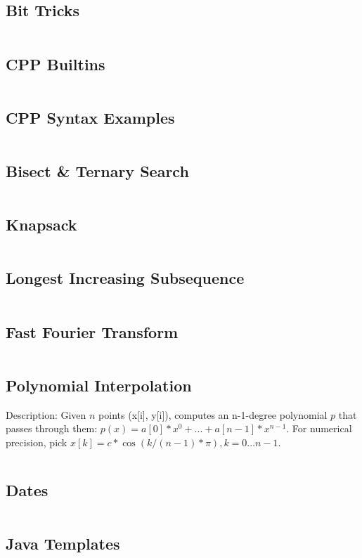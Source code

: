 \documentclass[letterpaper,landscape]{article}
\begin{document}
\begin{multicols*}{2}
  \subsection{Bit Tricks}
  \inputminted{cpp}{src/Misc/BitTricks.cpp}
  
  \subsection{CPP Builtins}
  \inputminted{text}{src/Misc/CPPBuiltins.cpp}
  
  \subsection{CPP Syntax Examples}
  \inputminted{cpp}{src/Misc/CPPSyntaxExamples.cpp}
  
  \subsection{Bisect \& Ternary Search}
  \inputminted{java}{src/Misc/Bisect.java}
  
  \subsection{Knapsack}
  \inputminted{java}{src/Misc/Knapsack.java}
  
  \subsection{Longest Increasing Subsequence}
  \inputminted{java}{src/Misc/LIS.java}
  
  \subsection{Fast Fourier Transform}
  \inputminted{cpp}{src/Misc/FFT.cpp}
  
  \subsection{Polynomial Interpolation}
  Description: Given $n$ points (x[i], y[i]), computes an n-1-degree polynomial $p$ that passes through them: $p(x) = a[0]*x^0 + ... + a[n-1]*x^{n-1}$. For numerical precision, pick $x[k] = c*\cos(k/(n-1)*\pi), k=0 \dots n-1$.
  \inputminted{cpp}{src/Misc/PolyInterpolate.cpp}
  
  \subsection{Dates}
  \inputminted{cpp}{src/Misc/Dates.cpp}
  
  \subsection{Java Templates}
  \inputminted{java}{src/Misc/JavaTricks.java}
  

  
\end{multicols*}
\end{document}
